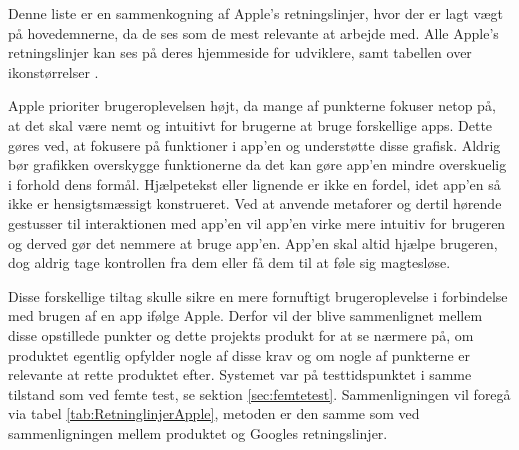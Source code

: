 Denne liste er en sammenkogning af Apple's retningslinjer, hvor der er lagt vægt på hovedemnerne, da de ses som de mest relevante at arbejde med. Alle Apple's retningslinjer kan ses på deres hjemmeside for udviklere, samt tabellen over ikonstørrelser \citep{AppleRetning}.

Apple prioriter brugeroplevelsen højt, da mange af punkterne fokuser netop på, at det skal være nemt og intuitivt for brugerne at bruge forskellige apps. Dette gøres ved, at fokusere på funktioner i app'en og understøtte disse grafisk. Aldrig bør grafikken overskygge funktionerne da det kan gøre app'en mindre overskuelig i forhold dens formål. Hjælpetekst eller lignende er ikke en fordel, idet app'en så ikke er hensigtsmæssigt konstrueret. 
Ved at anvende metaforer og dertil hørende gestusser til interaktionen med app'en vil app'en virke mere intuitiv for brugeren og derved gør det nemmere at bruge app'en. App'en skal altid hjælpe brugeren, dog aldrig tage kontrollen fra dem eller få dem til at føle sig magtesløse.

Disse forskellige tiltag skulle sikre en mere fornuftigt brugeroplevelse i forbindelse med brugen af en app ifølge Apple. Derfor vil der blive sammenlignet mellem disse opstillede punkter og dette projekts produkt for at se nærmere på, om produktet egentlig opfylder nogle af disse krav og om nogle af punkterne er relevante at rette produktet efter. Systemet var på testtidspunktet i samme tilstand som ved femte test, se sektion \ref{sec:femtetest}. Sammenligningen vil foregå via tabel \ref{tab:RetninglinjerApple}, metoden er den samme som ved sammenligningen mellem produktet og Googles retningslinjer.

